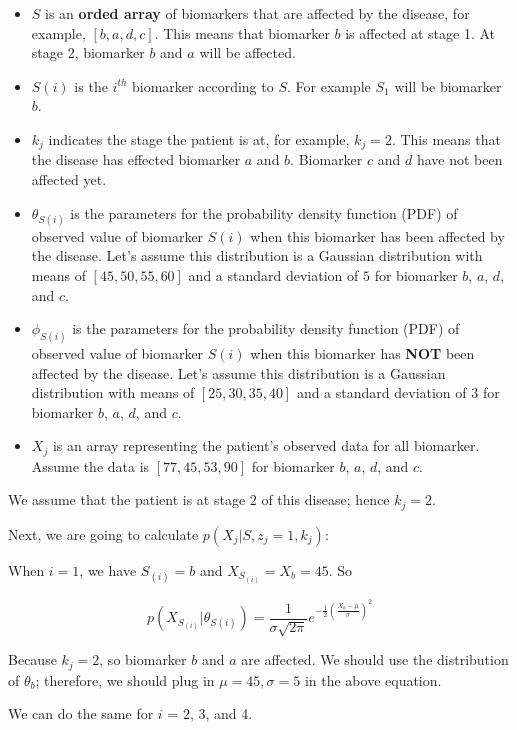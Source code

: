 \documentclass[
  letterpaper,
  DIV=11,
  numbers=noendperiod]{scrreprt}
\begin{document}
\begin{itemize}
\item
  \(S\) is an \textbf{orded array} of biomarkers that are affected by
  the disease, for example, \([b, a, d, c]\). This means that biomarker
  \(b\) is affected at stage 1. At stage 2, biomarker \(b\) and \(a\)
  will be affected.
\item
  \(S(i)\) is the \(i^{th}\) biomarker according to \(S\). For example
  \(S_1\) will be biomarker \(b\).
\item
  \(k_j\) indicates the stage the patient is at, for example,
  \(k_j = 2\). This means that the disease has effected biomarker \(a\)
  and \(b\). Biomarker \(c\) and \(d\) have not been affected yet.
\item
  \(\theta_{S(i)}\) is the parameters for the probability density
  function (PDF) of observed value of biomarker \(S(i)\) when this
  biomarker has been affected by the disease. Let's assume this
  distribution is a Gaussian distribution with means of
  \([45, 50, 55, 60]\) and a standard deviation of \(5\) for biomarker
  \(b\), \(a\), \(d\), and \(c\).
\item
  \(\phi_{S(i)}\) is the parameters for the probability density function
  (PDF) of observed value of biomarker \(S(i)\) when this biomarker has
  \textbf{NOT} been affected by the disease. Let's assume this
  distribution is a Gaussian distribution with means of
  \([25, 30, 35, 40]\) and a standard deviation of \(3\) for biomarker
  \(b\), \(a\), \(d\), and \(c\).
\item
  \(X_j\) is an array representing the patient's observed data for all
  biomarker. Assume the data is \([77, 45, 53, 90]\) for biomarker
  \(b\), \(a\), \(d\), and \(c\).
\end{itemize}

We assume that the patient is at stage \(2\) of this disease; hence
\(k_j = 2\).

Next, we are going to calculate \(p(X_j|S, z_j = 1, k_j)\):

When \(i = 1\), we have \(S_{(i)} = b\) and \(X_{S_{(i)}} = X_b = 45\).
So

\[p(X_{S_{(i)}} | \theta_{S(i)}) = \frac{1}{\sigma \sqrt{2 \pi}} e^{-\frac{1}{2}\left(\frac{X_b - \mu}{\sigma} \right)^2}\]

Because \(k_j = 2\), so biomarker \(b\) and \(a\) are affected. We
should use the distribution of \(\theta_b\); therefore, we should plug
in \(\mu = 45, \sigma = 5\) in the above equation.

We can do the same for \(i\) = 2, 3, and 4.
\end{document}
